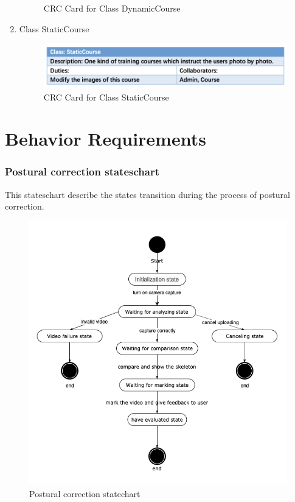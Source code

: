 \documentclass[16pt]{scrreprt}
\begin{document}
\begin{enumerate}
\begin{figure}[H]
            \caption{CRC Card for Class DynamicCourse}
            \label{fig:dynamic}
        \end{figure}
    \item Class StaticCourse
        \begin{figure}[H]
            \centering
            \includegraphics[width=1.1\textwidth]{figures/static.png}
            \caption{CRC Card for Class StaticCourse}
            \label{fig:static}
        \end{figure}
\end{enumerate}
\section{Behavior Requirements}

\subsubsection{Postural correction stateschart}

This stateschart describe the states transition during the process of postural correction.

\begin{figure}[H]
    \centering
    \includegraphics[width=1.0\textwidth]{figures/stateschart1.png}
    \caption{Postural correction statechart}
\end{figure}
\end{document}
